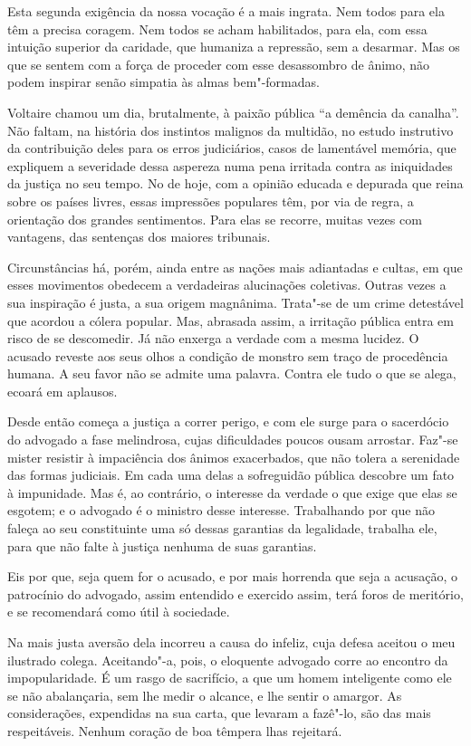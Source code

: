  Esta segunda exigência da nossa vocação é a mais ingrata. Nem todos
para ela têm a precisa coragem. Nem todos se acham habilitados, para
ela, com essa intuição superior da caridade, que humaniza a repressão,
sem a desarmar. Mas os que se sentem com a força de proceder com esse
desassombro de ânimo, não podem inspirar senão simpatia às almas
bem"-formadas. 

Voltaire chamou um dia, brutalmente, à paixão pública “a
demência da canalha”. Não faltam, na história dos instintos 
malignos da multidão, no estudo instrutivo da contribuição deles para os
erros judiciários, casos de lamentável memória, que expliquem a
severidade dessa aspereza numa pena irritada contra as iniquidades da
justiça no seu tempo. No de hoje, com a opinião educada e depurada que
reina sobre os países livres, essas impressões populares têm, por via
de regra, a orientação dos grandes sentimentos. Para elas se recorre,
muitas vezes com vantagens, das sentenças dos maiores tribunais.

 Circunstâncias há, porém, ainda entre as nações mais adiantadas e
cultas, em que esses movimentos obedecem a verdadeiras alucinações
coletivas. Outras vezes a sua inspiração é justa, a sua origem
magnânima. Trata"-se de um crime detestável que acordou a cólera
popular. Mas, abrasada assim, a irritação pública entra em risco de se
descomedir. Já não enxerga a verdade com a mesma lucidez. O acusado
reveste aos seus olhos a condição de monstro sem traço de procedência
humana. A seu favor não se admite uma palavra. Contra ele tudo o que se
alega, ecoará em aplausos. 

Desde então começa a justiça a correr
perigo, e com ele surge para o sacerdócio do advogado a fase
melindrosa, cujas dificuldades poucos ousam arrostar. Faz"-se mister
resistir à impaciência dos ânimos exacerbados, que não tolera a
serenidade das formas judiciais. Em cada uma delas a sofreguidão
pública descobre um fato à impunidade. Mas é, ao contrário, o interesse
da verdade o que exige que elas se esgotem; e o advogado é o ministro
desse interesse. Trabalhando por que não faleça ao seu constituinte uma
só dessas garantias da legalidade, trabalha ele, para que não falte à
justiça nenhuma de suas garantias.

 Eis por que, seja quem for o acusado, e por mais horrenda que seja a
acusação, o patrocínio do advogado, assim entendido e exercido assim,
terá foros de meritório, e se recomendará como útil à sociedade.

 Na mais justa aversão dela incorreu a causa do infeliz, cuja defesa
aceitou o meu ilustrado colega. Aceitando"-a, pois, o eloquente advogado
corre ao encontro da impopularidade. É um rasgo de sacrifício, a que um
homem inteligente como ele se não abalançaria, sem lhe medir o
alcance, e lhe sentir o amargor. As considerações, expendidas na sua
carta, que levaram a fazê"-lo, são das mais respeitáveis. Nenhum coração
de boa têmpera lhas rejeitará. 

